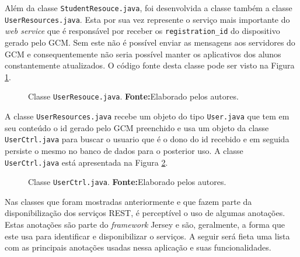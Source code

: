	\par Além da classe \texttt{StudentResouce.java}, foi desenvolvida
a classe também a classe \texttt{UserResources.java}. Esta por sua vez
represente o serviço mais importante do \textit{web service} que é responsável
por receber os \texttt{registration\_id} do dispositivo gerado pelo GCM. Sem
este não é possível enviar as mensagens aos servidores do GCM e
consequentemente não seria possível manter os aplicativos  dos alunos
constantemente atualizados. O código fonte desta classe pode ser visto na
Figura \ref{fig:desws26}.

	\begin{figure}[h!]
		
		\caption[Classe UserResouce.java]{Classe \texttt{UserResouce.java}.
		\textbf{Fonte:}Elaborado pelos autores.}
		\label{fig:desws26}
	\end{figure}
	
	\par A classe \texttt{UserResources.java} recebe um objeto do tipo
\texttt{User.java} que tem em seu conteúdo o id gerado pelo GCM preenchido e
usa um objeto da classe \texttt{UserCtrl.java} para buscar o usuario que é o
dono do id recebido e em seguida persiste o mesmo no banco de dados para o
posterior uso. A classe \texttt{UserCtrl.java} está apresentada na Figura
\ref{fig:desws27}.

	\begin{figure}[h!]
		
		\caption[Classe UserCtrl.java]{Classe \texttt{UserCtrl.java}.
		\textbf{Fonte:}Elaborado pelos autores.}
		\label{fig:desws27}
	\end{figure}
	
	\pagebreak
	
	\par Nas classes que foram mostradas anteriormente e que fazem parte da
disponibilização dos serviços REST, é perceptível o uso de algumas anotações.
Estas anotações são parte do \textit{framework} Jersey e são, geralmente, a forma que
este usa para identificar e disponibilizar o serviços. A seguir será fieta uma
lista com as principais anotações usadas nessa aplicação e suas funcionalidades.

